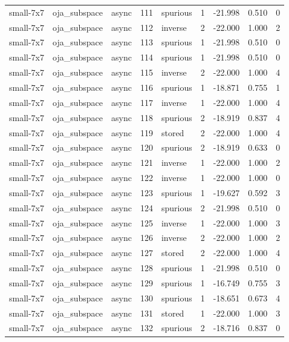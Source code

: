 \begin{tabular}{lllrlrrrr}
small-7x7 & oja\_subspace & async & 111 & spurious & 1 & -21.998 & 0.510 & 0 \\
small-7x7 & oja\_subspace & async & 112 & inverse & 2 & -22.000 & 1.000 & 2 \\
small-7x7 & oja\_subspace & async & 113 & spurious & 1 & -21.998 & 0.510 & 0 \\
small-7x7 & oja\_subspace & async & 114 & spurious & 1 & -21.998 & 0.510 & 0 \\
small-7x7 & oja\_subspace & async & 115 & inverse & 2 & -22.000 & 1.000 & 4 \\
small-7x7 & oja\_subspace & async & 116 & spurious & 1 & -18.871 & 0.755 & 1 \\
small-7x7 & oja\_subspace & async & 117 & inverse & 1 & -22.000 & 1.000 & 4 \\
small-7x7 & oja\_subspace & async & 118 & spurious & 2 & -18.919 & 0.837 & 4 \\
small-7x7 & oja\_subspace & async & 119 & stored & 2 & -22.000 & 1.000 & 4 \\
small-7x7 & oja\_subspace & async & 120 & spurious & 2 & -18.919 & 0.633 & 0 \\
small-7x7 & oja\_subspace & async & 121 & inverse & 1 & -22.000 & 1.000 & 2 \\
small-7x7 & oja\_subspace & async & 122 & inverse & 1 & -22.000 & 1.000 & 0 \\
small-7x7 & oja\_subspace & async & 123 & spurious & 1 & -19.627 & 0.592 & 3 \\
small-7x7 & oja\_subspace & async & 124 & spurious & 2 & -21.998 & 0.510 & 0 \\
small-7x7 & oja\_subspace & async & 125 & inverse & 1 & -22.000 & 1.000 & 3 \\
small-7x7 & oja\_subspace & async & 126 & inverse & 2 & -22.000 & 1.000 & 2 \\
small-7x7 & oja\_subspace & async & 127 & stored & 2 & -22.000 & 1.000 & 4 \\
small-7x7 & oja\_subspace & async & 128 & spurious & 1 & -21.998 & 0.510 & 0 \\
small-7x7 & oja\_subspace & async & 129 & spurious & 1 & -16.749 & 0.755 & 3 \\
small-7x7 & oja\_subspace & async & 130 & spurious & 1 & -18.651 & 0.673 & 4 \\
small-7x7 & oja\_subspace & async & 131 & stored & 1 & -22.000 & 1.000 & 3 \\
small-7x7 & oja\_subspace & async & 132 & spurious & 2 & -18.716 & 0.837 & 0 \\

\end{tabular}
